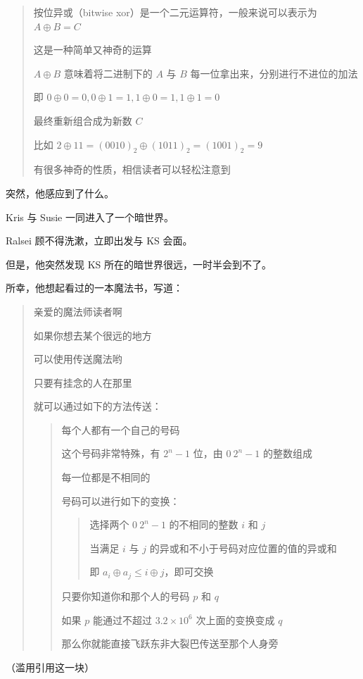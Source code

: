 \documentclass[12pt]{article}
\begin{document}
\begin{quote}
按位异或（bitwise xor）是一个二元运算符，一般来说可以表示为 $A\oplus B=C$

这是一种简单又神奇的运算

$A\oplus B$ 意味着将二进制下的 $A$ 与 $B$ 每一位拿出来，分别进行不进位的加法

即 $0\oplus 0=0,0\oplus 1=1,1\oplus 0=1,1\oplus 1=0$

最终重新组合成为新数 $C$

比如 $2\oplus 11=(0010)_2\oplus (1011)_2=(1001)_2=9$

有很多神奇的性质，相信读者可以轻松注意到
\end{quote}

突然，他感应到了什么。

Kris 与 Susie 一同进入了一个暗世界。

Ralsei 顾不得洗漱，立即出发与 KS 会面。

但是，他突然发现 KS 所在的暗世界很远，一时半会到不了。

所幸，他想起看过的一本魔法书，写道：

\begin{quote}
亲爱的魔法师读者啊

如果你想去某个很远的地方

可以使用传送魔法哟

只要有挂念的人在那里

就可以通过如下的方法传送：

  \begin{quote}
每个人都有一个自己的号码

这个号码非常特殊，有 $2^n-1$ 位，由 $0~2^n-1$ 的整数组成

每一位都是不相同的

号码可以进行如下的变换：

    \begin{quote}
选择两个 $0~2^n-1$ 的不相同的整数 $i$ 和 $j$

当满足 $i$ 与 $j$ 的异或和不小于号码对应位置的值的异或和

即 $a_i\oplus a_j\le i\oplus j$，即可交换
    \end{quote}
只要你知道你和那个人的号码 $p$ 和 $q$

如果 $p$ 能通过不超过 $3.2\times 10^6$ 次上面的变换变成 $q$

那么你就能直接飞跃东非大裂巴传送至那个人身旁
  \end{quote}
\end{quote}

（滥用引用这一块）
\end{document}
